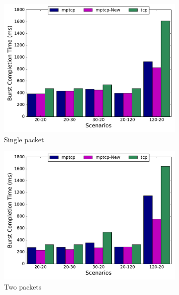 \documentclass[10pt,conference]{IEEEtran}
\begin{document}
\begin{figure}
\begin{subfigure}[b]{0.32\textwidth}
\includegraphics[angle=0, width=\textwidth, natwidth=578.16,natheight=433.62]{plots/1PNew.pdf}
\caption{Single packet}\label{1pn}
\end{subfigure}
\hfill
\begin{subfigure}[b]{0.32\textwidth}
\includegraphics[angle=0, width=\textwidth, natwidth=578.16,natheight=433.62]{plots/2PNew.pdf}
\caption{Two packets}\label{2pn}
\end{subfigure}
\hfill
\begin{subfigure}[b]{0.32\textwidth}

\end{subfigure}
\end{figure}
\end{document}
